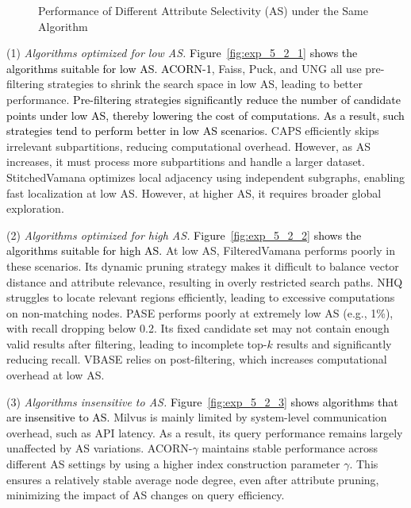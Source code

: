 \documentclass[sigconf, nonacm, pdfa]{acmart}
\begin{document}
{\begin{figure}
		\caption{Performance of Different Attribute Selectivity (AS) under the Same Algorithm}
		\label{fig:exp_5_2_combined}
	\end{figure}
	
	
	
	
	(1) \textit{Algorithms optimized for low AS.}  
	\textcolor{black}{Figure~\ref{fig:exp_5_2_1} shows the algorithms suitable for low AS.}
	\textcolor{black}{ACORN-1}, Faiss, Puck, and UNG all use pre-filtering strategies to shrink the search space in low AS, leading to better performance. \textcolor{black}{Pre-filtering strategies significantly reduce the number of candidate points under low AS, thereby lowering the cost of  computations. As a result, such strategies tend to perform better in low AS scenarios.} CAPS efficiently skips irrelevant subpartitions, reducing computational overhead. However, as AS increases, it must process more subpartitions and handle a larger dataset. StitchedVamana optimizes local adjacency using independent subgraphs, enabling fast localization at low AS. However, at higher AS, it requires broader global exploration. 
	

	
	\par
	(2) \textit{Algorithms optimized for high AS.}  
	\textcolor{black}{Figure~\ref{fig:exp_5_2_2} shows the algorithms suitable for high AS.}
	At low AS, FilteredVamana performs poorly in these scenarios. Its dynamic pruning strategy makes it difficult to balance vector distance and attribute relevance, resulting in overly restricted search paths. NHQ struggles to locate relevant regions efficiently, leading to excessive computations on non-matching nodes. 
	 PASE performs poorly at extremely low AS (e.g., 1\%), with recall dropping below 0.2. Its fixed candidate set may not contain enough valid results after filtering, leading to incomplete top-$k$ results and significantly reducing recall. VBASE relies on post-filtering, which increases computational overhead at low AS.
	
	\par
	(3) \textit{Algorithms insensitive to AS.}  
	\textcolor{black}{Figure~\ref{fig:exp_5_2_3} shows algorithms that are insensitive to AS.}
	Milvus is mainly limited by system-level communication overhead, such as API latency. As a result, its query performance remains largely unaffected by AS variations. ACORN-\(\gamma\) maintains stable performance across different AS settings by using a higher index construction parameter $\gamma$. This ensures a relatively stable average node degree, even after attribute pruning, minimizing the impact of AS changes on query efficiency.
	


}
\end{document}
